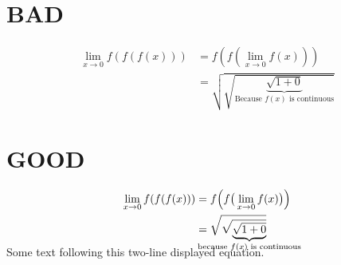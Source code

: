 \documentclass{article}
\begin{document}
\section{BAD}

\begin{align*}
\lim_{x\to0}f(f(f(x))) &= f\left(f\left(\lim_{x\to0}f(x)\right)\right) \\
&= \sqrt{\sqrt{\underbrace{\sqrt{1+0}}_{\text{Because $f(x)$ is continuous}}}}
\end{align*}


\section{GOOD}

\begin{align*}
\lim_{x\to0}f(f(f(x))) 
&= f\Bigl(f\bigl(\,\lim_{x\to0}f(x)\bigr)\Bigr) \\
&= \sqrt{\sqrt{\smash[b]{\underbrace{\sqrt{1+0}}_{%
   \mathclap{\text{because $f(x)$ is continuous}}}}}}\\ %
\end{align*}
Some text following this two-line displayed equation.
\end{document}
